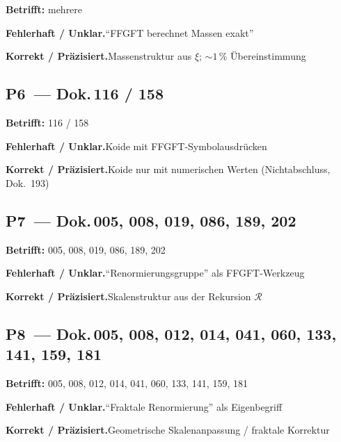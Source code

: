 \noindent\textbf{Betrifft:} mehrere


\smallskip\noindent\textbf{Fehlerhaft / Unklar.}\quad \enquote{FFGFT berechnet Massen exakt}


\smallskip\noindent\textbf{Korrekt / Präzisiert.}\quad Massenstruktur aus $\xi$; $\sim 1\,\%$ Übereinstimmung


\medskip


\subsection*{P6~--- Dok.\,116 / 158}

\noindent\textbf{Betrifft:} 116 / 158


\smallskip\noindent\textbf{Fehlerhaft / Unklar.}\quad Koide mit FFGFT-Symbolausdrücken


\smallskip\noindent\textbf{Korrekt / Präzisiert.}\quad Koide nur mit numerischen Werten (Nichtabschluss, Dok.~193)


\medskip


\subsection*{P7~--- Dok.\,005, 008, 019, 086, 189, 202}

\noindent\textbf{Betrifft:} 005, 008, 019, 086, 189, 202


\smallskip\noindent\textbf{Fehlerhaft / Unklar.}\quad \enquote{Renormierungsgruppe} als FFGFT-Werkzeug


\smallskip\noindent\textbf{Korrekt / Präzisiert.}\quad Skalenstruktur aus der Rekursion $\mathcal{R}$


\medskip


\subsection*{P8~--- Dok.\,005, 008, 012, 014, 041, 060, 133, 141, 159, 181}

\noindent\textbf{Betrifft:} 005, 008, 012, 014, 041, 060, 133, 141, 159, 181


\smallskip\noindent\textbf{Fehlerhaft / Unklar.}\quad \enquote{Fraktale Renormierung} als Eigenbegriff


\smallskip\noindent\textbf{Korrekt / Präzisiert.}\quad Geometrische Skalen\-anpassung / fraktale Korrektur


